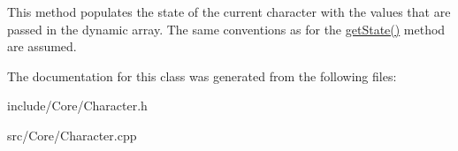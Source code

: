 This method populates the state of the current character with the values that are passed in the dynamic array. The same conventions as for the \hyperlink{classCartWheel_1_1Core_1_1Character_a690c7d5b7d36bdb1997558ab42bdc917}{getState()} method are assumed. 

The documentation for this class was generated from the following files:\begin{DoxyCompactItemize}
\item 
include/Core/Character.h\item 
src/Core/Character.cpp\end{DoxyCompactItemize}
